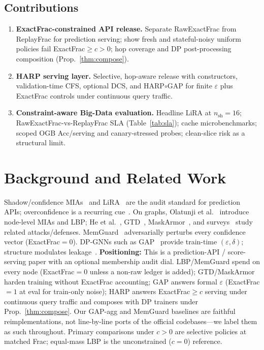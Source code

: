 \documentclass[conference]{IEEEtran}
\begin{document}
\subsection{Contributions}
\begin{enumerate}
  \item \textbf{ExactFrac-constrained API release.} Separate RawExactFrac from ReplayFrac for prediction serving; show fresh and stateful-noisy uniform policies fail ExactFrac$\ge c{>}0$; hop coverage and DP post-processing composition (Prop.~\ref{thm:compose}).
  \item \textbf{HARP serving layer.} Selective, hop-aware release with constructors, validation-time CFS, optional DCS, and HARP$\circ$GAP for finite $\varepsilon$ plus ExactFrac controls under continuous query traffic.
  \item \textbf{Constraint-aware Big-Data evaluation.} Headline LiRA at $n_{\mathrm{sh}}{=}16$; RawExactFrac-vs-ReplayFrac SLA (Table~\ref{tab:sla}); cache microbenchmarks; scoped OGB Acc/serving and canary-stressed probes; clean-slice risk as a structural limit.
\end{enumerate}

\section{Background and Related Work}
\label{sec:related}
Shadow/confidence MIAs~\cite{shokri2017membership,salem2019mlleaks,yeom2018privacy} and LiRA~\cite{carlini2022membership} are the audit standard for prediction APIs; overconfidence is a recurring cue~\cite{guo2017calibration}.
On graphs, Olatunji et al.~\cite{olatunji2021mia} introduce node-level MIAs and LBP; He et al.~\cite{he2021nodemia}, GTD~\cite{gtd2024}, MaskArmor~\cite{maskarmor2024}, and surveys~\cite{survey2023gnnprivacy} study related attacks/defenses.
MemGuard~\cite{jia2019memguard} adversarially perturbs every confidence vector (ExactFrac${=}0$).
DP-GNNs such as GAP~\cite{sajadmanesh2023gap,abadi2016deepdp} provide train-time $(\varepsilon,\delta)$; structure modulates leakage~\cite{zhu2020beyondhomophily,khosla2026structure}.
\textbf{Positioning:} This is a prediction-API / score-serving paper with an optional membership audit dial.
LBP/MemGuard spend on every node (ExactFrac${=}0$ unless a non-raw ledger is added); GTD/MaskArmor harden training without ExactFrac accounting; GAP answers formal $\varepsilon$ (ExactFrac${=}1$ at eval for train-only noise); HARP answers ExactFrac$\ge c$ serving under continuous query traffic and composes with DP trainers under Prop.~\ref{thm:compose}.
Our GAP-agg and MemGuard baselines are faithful reimplementations, not line-by-line ports of the official codebases---we label them as such throughout.
Primary comparisons under $c{>}0$ are selective policies at matched Frac; equal-mass LBP is the unconstrained ($c{=}0$) reference.
\end{document}
